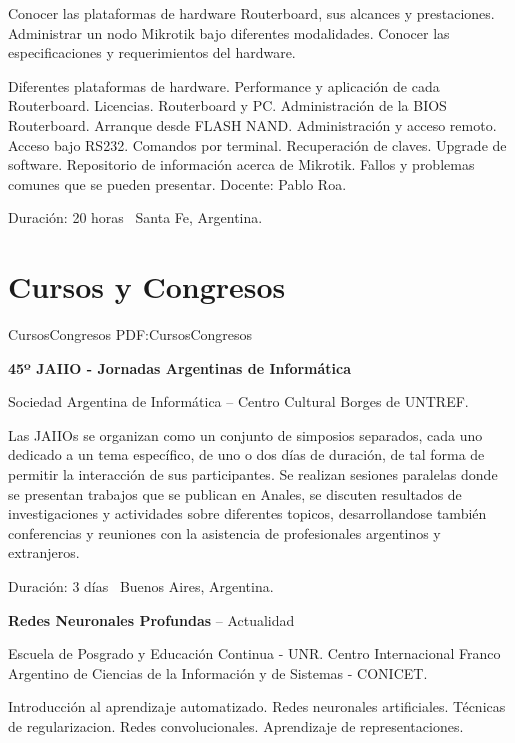 \documentclass[letterpaper,MMMyyyy,nonstop]{simpleresumecv}
\begin{document}
\begin{body}
\BulletItem Conocer las plataformas de hardware Routerboard, sus alcances y prestaciones. Administrar un nodo Mikrotik bajo diferentes modalidades. Conocer las especificaciones y requerimientos del hardware.
\begin{detail}
	\SubBulletItem 
	Diferentes plataformas de hardware. Performance y aplicación de cada Routerboard. Licencias. Routerboard y PC. Administración de la BIOS Routerboard. Arranque desde FLASH NAND. Administración y acceso remoto. Acceso bajo RS232. Comandos por terminal. Recuperación de claves. Upgrade de software. Repositorio de información acerca de Mikrotik. Fallos y problemas comunes que se pueden presentar.
	\SubBulletItem Docente: Pablo Roa.
\end{detail}
Duración: 20 horas \SubBulletSymbol\, Santa Fe, Argentina.




\section{Cursos y \newline	Congresos}
{CursosCongresos}
{PDF:CursosCongresos}


\textbf{45º JAIIO - Jornadas Argentinas de Informática}
\hfill
{}

\BulletItem Sociedad Argentina de Informática – Centro Cultural Borges de UNTREF.
\begin{detail}
	\SubBulletItem
	Las JAIIOs se organizan como un conjunto de simposios separados, cada uno dedicado a un tema específico, de uno o dos días de duración, de tal forma de permitir la interacción de sus participantes. Se realizan sesiones paralelas donde se presentan trabajos que se publican en Anales, se discuten resultados de investigaciones y actividades sobre diferentes topicos, desarrollandose también conferencias y reuniones con la asistencia de profesionales argentinos y extranjeros.
\end{detail}
Duración: 3 días \SubBulletSymbol\, Buenos Aires, Argentina.

\BigGap
\textbf{Redes Neuronales Profundas}
\hfill
{} --
Actualidad

\BulletItem Escuela de Posgrado y Educación Continua - UNR. Centro Internacional Franco Argentino de Ciencias de la Información y de Sistemas - CONICET.
\begin{detail}
	\SubBulletItem 
	Introducción al aprendizaje automatizado. Redes neuronales artificiales. Técnicas de regularizacion. Redes convolucionales. Aprendizaje de representaciones.
	

\end{detail}
\end{body}
\end{document}
